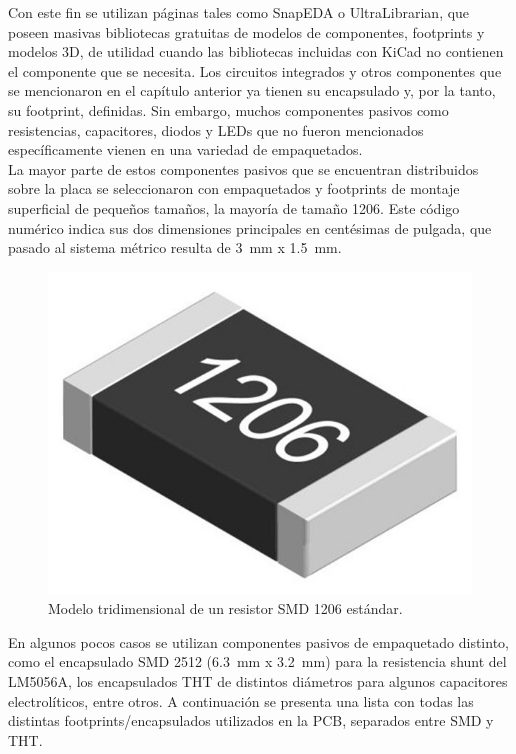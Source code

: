 Con este fin se utilizan páginas tales como SnapEDA o UltraLibrarian, que poseen masivas bibliotecas gratuitas de modelos de componentes, footprints y modelos 3D, de utilidad cuando las bibliotecas incluidas con KiCad no contienen el componente que se necesita. Los circuitos integrados y otros componentes que se mencionaron en el capítulo anterior ya tienen su encapsulado y, por la tanto, su footprint, definidas. Sin embargo, muchos componentes pasivos como resistencias, capacitores, diodos y LEDs que no fueron mencionados específicamente vienen en una variedad de empaquetados.\\

La mayor parte de estos componentes pasivos que se encuentran distribuidos sobre la placa se seleccionaron con empaquetados y footprints de montaje superficial de pequeños tamaños, la mayoría de tamaño 1206. Este código numérico indica sus dos dimensiones principales en centésimas de pulgada, que pasado al sistema métrico resulta de \SI[]{3}{\milli\meter} x \SI[]{1.5}{\milli\meter}.\\

\begin{figure}[h]
    \centering
    \includegraphics[scale=0.4]{Imagenes/1206.jpg}
    \caption{Modelo tridimensional de un resistor SMD 1206 estándar.}
    \label{smd1206}
\end{figure}

En algunos pocos casos se utilizan componentes pasivos de empaquetado distinto, como el encapsulado SMD 2512 (\SI[]{6.3}{\milli\meter} x \SI[]{3.2}{\milli\meter}) para la resistencia shunt del LM5056A, los encapsulados THT de distintos diámetros para algunos capacitores electrolíticos, entre otros. A continuación se presenta una lista con todas las distintas footprints/encapsulados utilizados en la PCB, separados entre SMD y THT.\\

